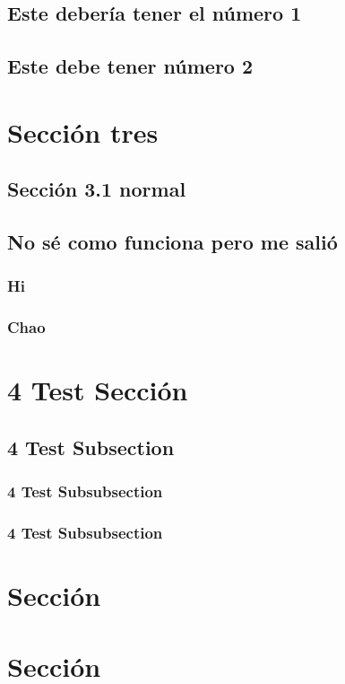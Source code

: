 	\subsection{Este debería tener el número 1}
	\subsection{Este debe tener número 2}

\section{Sección tres}
	\subsection{Sección 3.1 normal}
	\subsection{No sé como funciona pero me salió}
		\subsubsection{Hi}
		\subsubsection{Chao}
		
\section{4 Test Sección}
\subsection{4 Test Subsection}
\subsubsection{4 Test Subsubsection}
\subsubsection{4 Test Subsubsection}
\section{Sección}
\section{Sección}
